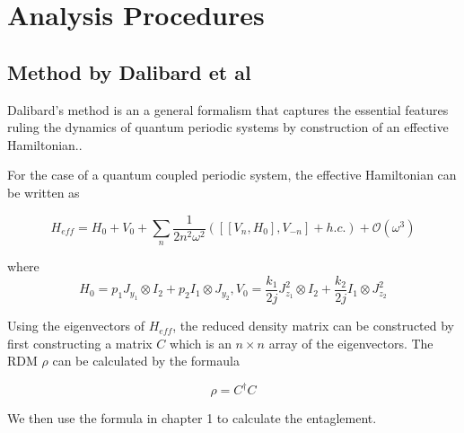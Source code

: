 
\chapter{Analysis Procedures} %

\label{Chapter2} %


\section{Method by Dalibard et al}

Dalibard's method is an a general formalism that captures the essential features ruling the dynamics of quantum periodic systems by construction of an effective Hamiltonian.\cite{dalibard}.

For the case of a quantum coupled periodic system, the effective Hamiltonian can be written as

\begin{equation}
H_{eff}=H_0 + V_0 + \sum_{n} \frac{1}{2n^2\omega^2}([[V_n,H_0],V_{-n}]+h.c.) + \mathcal{O}(\omega^3)
\end{equation}

where
\begin{equation}
H_0 = p_1J_{y_1} \otimes I_2 + p_2I_1 \otimes J_{y_2},
V_0 = \frac{k_1}{2j}J_{z_1}^2 \otimes I_2 + \frac{k_2}{2j}I_1 \otimes J_{z_2}^2
\end{equation}

Using the eigenvectors of $H_{eff}$, the reduced density matrix can be constructed by first constructing a matrix $C$ which is an $n\times n$ array of the eigenvectors. The RDM $\rho$ can be calculated by the formaula

\begin{equation}
\rho= C^\dagger C
\end{equation}

We then use the formula in chapter 1 to calculate the entaglement.


